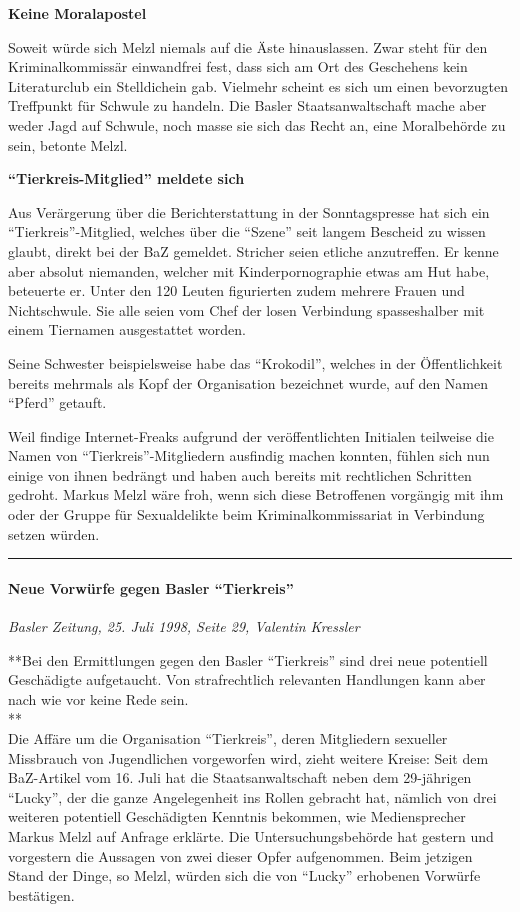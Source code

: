 \textbf{Keine Moralapostel}

Soweit würde sich Melzl niemals auf die Äste hinauslassen. Zwar steht
für den Kriminalkommissär einwandfrei fest, dass sich am Ort des
Geschehens kein Literaturclub ein Stelldichein gab. Vielmehr scheint es
sich um einen bevorzugten Treffpunkt für Schwule zu handeln. Die Basler
Staatsanwaltschaft mache aber weder Jagd auf Schwule, noch masse sie
sich das Recht an, eine Moralbehörde zu sein, betonte Melzl.

\textbf{``Tierkreis-Mitglied'' meldete sich}

Aus Verärgerung über die Berichterstattung in der Sonntagspresse hat
sich ein ``Tierkreis''-Mitglied, welches über die ``Szene'' seit langem
Bescheid zu wissen glaubt, direkt bei der BaZ gemeldet. Stricher seien
etliche anzutreffen. Er kenne aber absolut niemanden, welcher mit
Kinderpornographie etwas am Hut habe, beteuerte er. Unter den 120 Leuten
figurierten zudem mehrere Frauen und Nichtschwule. Sie alle seien vom
Chef der losen Verbindung spasseshalber mit einem Tiernamen ausgestattet
worden.

Seine Schwester beispielsweise habe das ``Krokodil'', welches in der
Öffentlichkeit bereits mehrmals als Kopf der Organisation bezeichnet
wurde, auf den Namen ``Pferd'' getauft.

Weil findige Internet-Freaks aufgrund der veröffentlichten Initialen
teilweise die Namen von ``Tierkreis''-​Mitgliedern ausfindig machen
konnten, fühlen sich nun einige von ihnen bedrängt und haben auch
bereits mit rechtlichen Schritten gedroht. Markus Melzl wäre froh, wenn
sich diese Betroffenen vorgängig mit ihm oder der Gruppe für
Sexualdelikte beim Kriminalkommissariat in Verbindung setzen würden.

\begin{center}\rule{0.5\linewidth}{\linethickness}\end{center}

\hypertarget{neue-vorwuxfcrfe-gegen-basler-tierkreis}{%
\paragraph{Neue Vorwürfe gegen Basler
``Tierkreis''}\label{neue-vorwuxfcrfe-gegen-basler-tierkreis}}

\emph{Basler Zeitung, 25. Juli 1998, Seite 29, Valentin Kressler}

**Bei den Ermittlungen gegen den Basler ``Tierkreis'' sind drei neue
potentiell Geschädigte aufgetaucht. Von strafrechtlich relevanten
Handlungen kann aber nach wie vor keine Rede sein.\\
**\\
Die Affäre um die Organisation ``Tierkreis'', deren Mitgliedern
sexueller Missbrauch von Jugendlichen vorgeworfen wird, zieht weitere
Kreise: Seit dem BaZ-Artikel vom 16. Juli hat die Staatsanwaltschaft
neben dem 29-jährigen ``Lucky'', der die ganze Angelegenheit ins Rollen
gebracht hat, nämlich von drei weiteren potentiell Geschädigten Kenntnis
bekommen, wie Mediensprecher Markus Melzl auf Anfrage erklärte. Die
Untersuchungsbehörde hat gestern und vorgestern die Aussagen von zwei
dieser Opfer aufgenommen. Beim jetzigen Stand der Dinge, so Melzl,
würden sich die von ``Lucky'' erhobenen Vorwürfe bestätigen.

